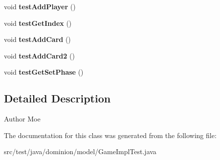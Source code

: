 \begin{DoxyCompactItemize}
\item 
\hypertarget{classdominion_1_1model_1_1GameImplTest_a0891941d72054e4e02ce282dac6a0a54}{void {\bfseries test\-Add\-Player} ()}\label{classdominion_1_1model_1_1GameImplTest_a0891941d72054e4e02ce282dac6a0a54}

\item 
\hypertarget{classdominion_1_1model_1_1GameImplTest_a3113a1437da8207339ab584bbae953d9}{void {\bfseries test\-Get\-Index} ()}\label{classdominion_1_1model_1_1GameImplTest_a3113a1437da8207339ab584bbae953d9}

\item 
\hypertarget{classdominion_1_1model_1_1GameImplTest_af431a8bb54d08775c78a55b4ce342727}{void {\bfseries test\-Add\-Card} ()}\label{classdominion_1_1model_1_1GameImplTest_af431a8bb54d08775c78a55b4ce342727}

\item 
\hypertarget{classdominion_1_1model_1_1GameImplTest_aad3b7d260daad2177d97c63412e8ac50}{void {\bfseries test\-Add\-Card2} ()}\label{classdominion_1_1model_1_1GameImplTest_aad3b7d260daad2177d97c63412e8ac50}

\item 
\hypertarget{classdominion_1_1model_1_1GameImplTest_a9d2d6ec3ed272370e17b1624073516c1}{void {\bfseries test\-Get\-Set\-Phase} ()}\label{classdominion_1_1model_1_1GameImplTest_a9d2d6ec3ed272370e17b1624073516c1}

\end{DoxyCompactItemize}


\subsection{\-Detailed \-Description}
\begin{DoxyAuthor}{\-Author}
\-Moe 
\end{DoxyAuthor}


\-The documentation for this class was generated from the following file\-:\begin{DoxyCompactItemize}
\item 
src/test/java/dominion/model/\-Game\-Impl\-Test.\-java\end{DoxyCompactItemize}
